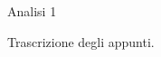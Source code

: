 \documentclass[11pt,a4paper]{article}
\begin{document}
\begin{center}\LARGE Analisi 1\end{center}
Trascrizione degli appunti.



\end{document}

